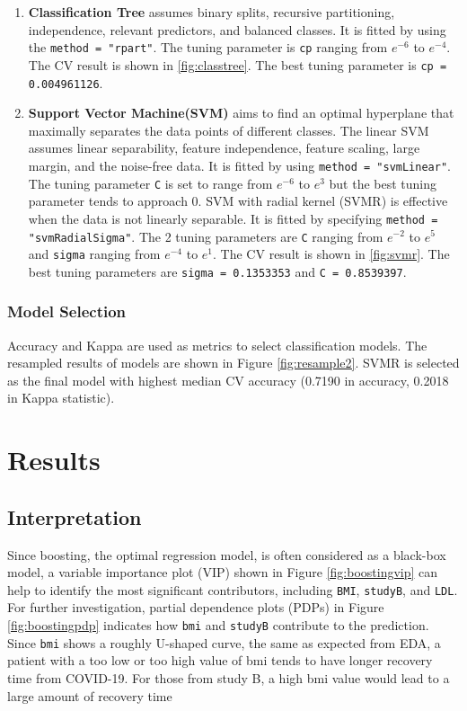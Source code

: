 \documentclass[11pt]{article}
\begin{document}
\begin{enumerate}
\item \textbf{Classification Tree} assumes binary splits, recursive partitioning, independence, relevant predictors, and balanced classes. It is fitted by using the \texttt{method = "rpart"}. The tuning parameter is \texttt{cp} ranging from $e^{-6}$ to $e^{-4}$. The CV result is shown in \ref{fig:classtree}. The best tuning parameter is \texttt{cp = 0.004961126}. 

\item \textbf{Support Vector Machine(SVM)} aims to find an optimal hyperplane that maximally separates the data points of different classes. The linear SVM assumes linear separability, feature independence, feature scaling, large margin, and the noise-free data. It is fitted by using \texttt{method = "svmLinear"}. The tuning parameter \texttt{C} is set to range from $e^{-6}$ to $e^{3}$ but the best tuning parameter tends to approach 0. SVM with radial kernel (SVMR) is effective when the data is not linearly separable. It is fitted by specifying \texttt{method = "svmRadialSigma"}. The 2 tuning parameters are \texttt{C} ranging from $e^{-2}$ to $e^{5}$ and \texttt{sigma} ranging from $e^{-4}$ to $e^{1}$. The CV result is shown in \ref{fig:svmr}. The best tuning parameters are \texttt{sigma = 0.1353353} and \texttt{C = 0.8539397}.

\end{enumerate}

\subsubsection{Model Selection}
Accuracy and Kappa are used as metrics to select classification models.
The resampled results of models are shown in Figure \ref{fig:resample2}.  SVMR is selected as the final model with highest median CV accuracy (0.7190 in accuracy, 0.2018 in Kappa statistic).

\section{Results}

\subsection{Interpretation}

Since boosting, the optimal regression model, is often considered as a black-box model, a variable importance plot (VIP) shown in Figure \ref{fig:boostingvip} can help to identify the most significant contributors, including \texttt{BMI}, \texttt{studyB}, and \texttt{LDL}. For further investigation, partial dependence plots (PDPs) in Figure \ref{fig:boostingpdp} indicates how \texttt{bmi} and \texttt{studyB} contribute to the prediction. Since \texttt{bmi} shows a roughly U-shaped curve, the same as expected from EDA, a patient with a too low or too high value of bmi tends to have longer recovery time from COVID-19. For those from study B, a high bmi value would lead to a large amount of recovery time
\end{document}
